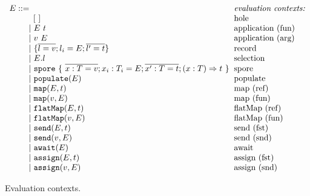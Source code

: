 \begin{figure}
\centering
 $\ba[t]{l@{\hspace{2mm}}l}
E ::=                                                                                                     & \mbox{\it{evaluation contexts:}} \\
\gap \:\:\:\: [~]                                                                                         & \mbox{hole} \\
\gap ~|~  E~t                                                                                             & \mbox{application (fun)} \\
\gap ~|~  v~E                                                                                             & \mbox{application (arg)} \\
\gap ~|~  \{ \seq{l = v} ; l_i = E ; \seq{l' = t} \}                                                      & \mbox{record} \\
\gap ~|~  E.l                                                                                             & \mbox{selection} \\
\gap ~|~  \texttt{spore}~\{~\seq{x : T = v} ; x_i : T_i = E ; \seq{x' : T = t} ; (x: T) \Rightarrow t~\}  & \mbox{spore} \\
\gap ~|~  \texttt{populate}(E)                                                                            & \mbox{populate} \\
\gap ~|~  \texttt{map}(E, t)                                                                              & \mbox{map (ref)} \\
\gap ~|~  \texttt{map}(v, E)                                                                              & \mbox{map (fun)} \\
\gap ~|~  \texttt{flatMap}(E, t)                                                                          & \mbox{flatMap (ref)} \\
\gap ~|~  \texttt{flatMap}(v, E)                                                                          & \mbox{flatMap (fun)} \\
\gap ~|~  \texttt{send}(E, t)                                                                             & \mbox{send (fst)} \\
\gap ~|~  \texttt{send}(v, E)                                                                             & \mbox{send (snd)} \\
\gap ~|~  \texttt{await}(E)                                                                               & \mbox{await} \\
\gap ~|~  \texttt{assign}(E, t)                                                                           & \mbox{assign (fst)} \\
\gap ~|~  \texttt{assign}(v, E)                                                                           & \mbox{assign (snd)} \\
\ea$
\caption{Evaluation contexts.}\label{fig:eval-ctx}
\end{figure}

